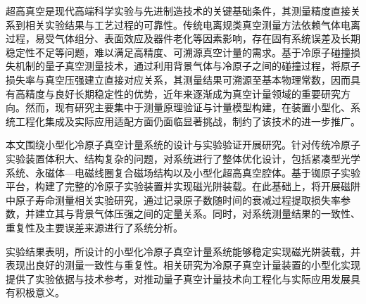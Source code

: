 
超高真空是现代高端科学实验与先进制造技术的关键基础条件，其测量精度直接关系到相关实验结果与工艺过程的可靠性。传统电离规类真空测量方法依赖气体电离过程，易受气体组分、表面效应及器件老化等因素影响，存在固有系统误差及长期稳定性不足等问题，难以满足高精度、可溯源真空计量的需求。基于冷原子碰撞损失机制的量子真空测量技术，通过利用背景气体与冷原子之间的碰撞过程，将原子损失率与真空压强建立直接对应关系，其测量结果可溯源至基本物理常数，因而具有高精度与良好长期稳定性的优势，近年来逐渐成为真空计量领域的重要研究方向。然而，现有研究主要集中于测量原理验证与计量模型构建，在装置小型化、系统工程化集成及实际应用适配方面仍面临显著挑战，制约了该技术的进一步推广。

本文围绕小型化冷原子真空计量系统的设计与实验验证开展研究。针对传统冷原子实验装置体积大、结构复杂的问题，对系统进行了整体优化设计，包括紧凑型光学系统、永磁体—电磁线圈复合磁场结构以及小型化超高真空腔体。基于铷原子实验平台，构建了完整的冷原子实验装置并实现磁光阱装载。在此基础上，将开展磁阱中原子寿命测量相关实验研究，通过记录原子数随时间的衰减过程提取损失率参数，并建立其与背景气体压强之间的定量关系。同时，对系统测量结果的一致性、重复性及主要误差来源进行了系统分析。

实验结果表明，所设计的小型化冷原子真空计量系统能够稳定实现磁光阱装载，并表现出良好的测量一致性与重复性。相关研究为冷原子真空计量装置的小型化实现提供了实验依据与技术参考，对推动量子真空计量技术向工程化与实际应用发展具有积极意义。


